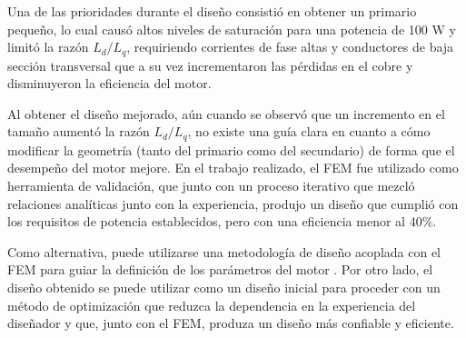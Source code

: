 Una de las prioridades durante el diseño consistió en obtener un primario pequeño, lo cual causó altos niveles de saturación para una potencia de 100 W y limitó la razón $L_d/L_q$, requiriendo corrientes de fase altas y conductores de baja sección transversal que a su vez incrementaron las pérdidas en el cobre y disminuyeron la eficiencia del motor.

Al obtener el diseño mejorado, aún cuando se observó que un incremento en el tamaño aumentó la razón $L_d/L_q$, no existe una guía clara en cuanto a cómo modificar la geometría (tanto del primario como del secundario) de forma que el desempeño del motor mejore. En el trabajo realizado, el FEM fue utilizado como herramienta de validación, que junto con un proceso iterativo que mezcló relaciones analíticas junto con la experiencia, produjo un diseño que cumplió con los requisitos de potencia establecidos, pero con una eficiencia menor al 40\%.

Como alternativa, puede utilizarse una metodología de diseño acoplada con el FEM para guiar la definición de los parámetros del motor \cite{hasanien2010}. Por otro lado, el diseño obtenido se puede utilizar como un diseño inicial para proceder con un método de optimización que reduzca la dependencia en la experiencia del diseñador y que, junto con el FEM, produza un diseño más confiable y eficiente.



